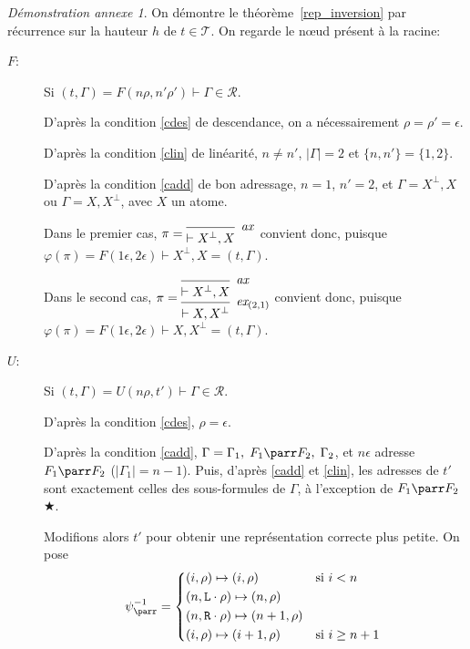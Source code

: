 \documentclass[11pt,a4paper]{article}
\theoremstyle{plain}
\theoremstyle{definition}
\theoremstyle{remark}
\newtheorem{demonstrationappendix}{Démonstration annexe}
\newcommand*{\orth}{^\perp}
\newcommand*{\axv}[1]{\infer{0}[\ensuremath{\mathit{ax}}]{\vdash #1}}
\newcommand*{\permv}[2]{\infer{1}[\ensuremath{\textit{ex}_{#1}}]{\vdash #2}}
\newcommand*{\someadd}{\rho}
\newcommand*{\someproof}{\pi}
\newcommand*{\sequent}{\Gamma}
\newcommand*{\size}[1]{\mathopen{|}#1\mathclose{|}}
\newcommand*{\Left}{\textnormal{\texttt{L}}}
\newcommand*{\Right}{\textnormal{\texttt{R}}}
\newcommand*{\trees}{\ensuremath{\mathcal{T}}}
\newcommand*{\representations}{\ensuremath{\mathcal{R}}}
\newcommand*{\encode}{\ensuremath{\varphi}}
\newcommand*{\height}{\ensuremath{h}}
\begin{document}
\begin{demonstrationappendix}
    \label{proof_rep_inversion}
    On démontre le théorème~\ref{rep_inversion} par récurrence sur la hauteur $\height$ de $t \in \trees$. On regarde le n\oe ud présent à la racine:
    \begin{description}
        \item[$F$:]    
        Si $(t, \sequent) = F(n\rho, n'\rho') \vdash \sequent \in \representations$.
    
        D'après la condition \ref{cdes} de descendance, on a nécessairement $\rho = \rho' = \epsilon$.
    
        D'après la condition \ref{clin} de linéarité, $n \neq n'$, $\size{\sequent} = 2$ et $\{n, n'\} = \{1, 2\}$.
    
        D'après la condition \ref{cadd} de bon adressage, $n = 1$, $n' = 2$, et $\sequent = X\orth, X$ ou $\sequent = X, X\orth$, avec $X$ un atome.
    
        Dans le premier cas,
        $\someproof = \begin{prooftree}
                \axv{X\orth, X}
            \end{prooftree}$ convient donc, puisque $\encode \left( \someproof \right) = F(1 \epsilon, 2 \epsilon) \vdash X\orth, X = (t, \sequent)$.
    
        Dans le second cas,
        $\someproof = \begin{prooftree}
                \axv{X\orth, X}
                \permv{(2, 1)}{X, X\orth}
            \end{prooftree}$ convient donc, puisque $\encode \left( \someproof \right) = F(1 \epsilon, 2 \epsilon) \vdash X, X\orth = (t, \sequent)$.
         
        \item[$U$:] Si $(t, \sequent) = U(n\rho, t') \vdash \sequent \in \representations$.
    
        D'après la condition \ref{cdes}, $\rho = \epsilon$.
    
        D'après la condition \ref{cadd}, $\sequent = \sequent_1, \; F_1 \parr F_2, \; \sequent_2$, et $n\epsilon$ adresse $F_1 \parr F_2$ ($\size{\sequent_1} = n-1$). Puis, d'après \ref{cadd} et \ref{clin}, les adresses de $t'$ sont exactement celles des sous-formules de $\sequent$, à l'exception de $F_1 \parr F_2$ $\bigstar$.
    
        Modifions alors $t'$ pour obtenir une représentation correcte plus petite. On pose 
        \begin{equation*}
            \psi_\parr^{-1} =
            \begin{cases*}
                (i, \someadd) \mapsto (i, \someadd) & si $i < n$\\
                (n, \Left \cdot \someadd) \mapsto (n, \someadd)\\
                (n, \Right \cdot \someadd) \mapsto (n+1, \someadd)\\
                (i, \someadd) \mapsto (i+1, \someadd) & si $i \geq n+1$
            \end{cases*}
        \end{equation*}
        

\end{description}
\end{demonstrationappendix}
\end{document}
